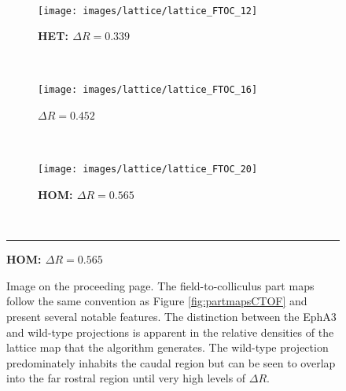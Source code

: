 \begin{landscape}
\begin{figure}[h!]
	~\unskip\ \vrule\ 
	\begin{subfigure}{0.475\textwidth}
		\caption{\textbf{HET: $\Delta R =  0.339$}}
		\texttt{[image: images/lattice/lattice\_FTOC\_12]}
		
	\end{subfigure}
	~\unskip\ \vrule\ 
	\begin{subfigure}{0.475\textwidth}
		\caption{\textbf{$\Delta R =  0.452$}}
		\texttt{[image: images/lattice/lattice\_FTOC\_16]}
		
	\end{subfigure}
	~\unskip\ \vrule\ 
	\begin{subfigure}{0.475\textwidth}
		\caption{\textbf{HOM: $\Delta R =  0.565$}}
		\texttt{[image: images/lattice/lattice\_FTOC\_20]}
		
	\end{subfigure}
	~\unskip\ \vrule\ 
	\hrule width1.505\textwidth
\end{figure}
\end{landscape}

\addtocounter{figure}{-2}
\begin{figure}[h!]
	\centering
	\def\c{The field-to-colliculus part maps follow the same convention as Figure \ref{fig:partmapsCTOF} and present several notable features. }
	\caption[\c]{Image on the proceeding page. \c The distinction between the EphA3 and wild-type projections is apparent in the relative densities of the lattice map that the algorithm generates. The wild-type projection predominately inhabits the caudal region but can be seen to overlap into the far rostral region until very high levels of $\Delta R$.  \label{fig:partmapsFTOC}}
\end{figure}
